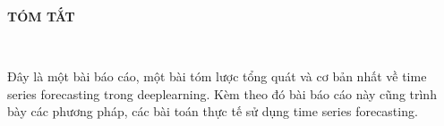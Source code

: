 \newpage
\changefontsizes{16pt}
\centerline{\textbf{TÓM TẮT}}\

\changefontsizes{13pt}
\setlength{\parindent}{2em}
Đây là một bài báo cáo, một bài tóm lược tổng quát và cơ bản nhất về time series forecasting trong deeplearning. Kèm theo đó bài báo cáo này cũng trình bày các phương pháp, các bài toán thực tế sử dụng time series forecasting.